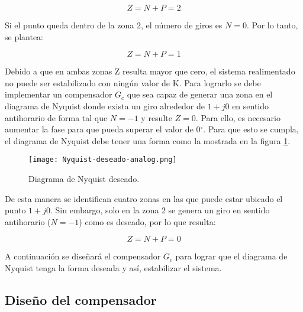 \begin{equation*}
	Z = N + P = 2
\end{equation*}


Si el punto queda dentro de la zona 2, el número de giros es $N=0$. Por lo tanto, se plantea:

\begin{equation*}
	Z = N + P = 1
\end{equation*}

Debido a que en ambas zonas Z resulta mayor que cero, el sistema realimentado no puede ser estabilizado con ningún valor de K. Para lograrlo se debe implementar un compensador $G_c$ que sea capaz de generar una zona en el diagrama de Nyquist donde exista un giro alrededor de $1 + j0$ en sentido antihorario de forma tal que $N=-1$ y resulte $Z=0$. Para ello, es necesario aumentar la fase para que pueda superar el valor de 0$\mathrm{{}^\circ}$. Para que esto se cumpla, el diagrama de Nyquist debe tener una forma como la  mostrada en la figura \ref{fig:nyquist-deseado-analog}.

\begin{figure}[H]
	\centering
	\texttt{[image: Nyquist-deseado-analog.png]}
	\caption{Diagrama de Nyquist deseado.}
	\label{fig:nyquist-deseado-analog}
\end{figure}

De esta manera se identifican cuatro zonas en las que puede estar ubicado el punto $1+j0$. Sin embargo, solo en la zona 2 se genera un giro en sentido antihorario ($N=-1$) como es deseado, por lo que resulta:

\begin{equation*}
	Z = N + P = 0
\end{equation*}


A continuación se diseñará el compensador $G_c$ para lograr que el diagrama de Nyquist tenga la forma deseada y así, estabilizar el sistema.


\subsection{Diseño del compensador}

